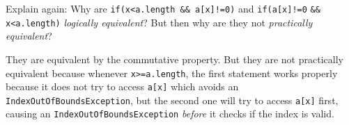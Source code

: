 \begin{exa}
%
%
\end{exa}

\begin{ques}
Explain again: Why are \verb+if(x<a.length && a[x]!=0)+ and 
\verb+if(a[x]!=0+ \verb+&&+ \verb+x<a.length)+  
{\em logically equivalent}?
But then why are they not {\em practically equivalent}?\\
\answerlinethree
\begin{answer}
They are equivalent by the commutative property.
But they are not practically equivalent because
whenever \verb+x>=a.length+, the first statement works
properly because it does not try to access \verb+a[x]+
which avoids an \verb+IndexOutOfBoundsException+,
but the second one will try to access \verb+a[x]+ first,
causing an \verb+IndexOutOfBoundsException+ {\em before}
it checks if the index is valid.
\end{answer}
\end{ques}


